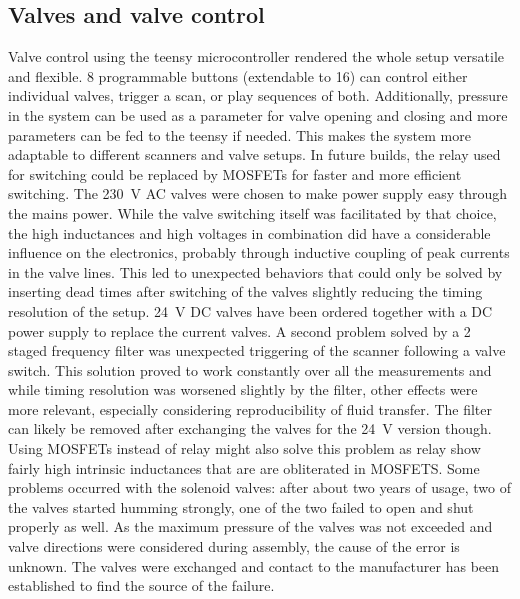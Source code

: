         \subsection{Valves and valve control}
            Valve control using the teensy microcontroller rendered the whole setup versatile and flexible. 8 programmable buttons (extendable to 16) can control either individual valves, trigger a scan, or play sequences of both. Additionally, pressure in the system can be used as a parameter for valve opening and closing and more parameters can be fed to the teensy if needed. This makes the system more adaptable to different scanners and valve setups. In future builds, the relay used for switching could be replaced by MOSFETs for faster and more efficient switching. 
            The \SI{230}{\volt} AC valves were chosen to make power supply easy through the mains power. While the valve switching itself was facilitated by that choice, the high inductances and high voltages in combination did have a considerable influence on the electronics, probably through inductive coupling of peak currents in the valve lines. This led to unexpected behaviors that could only be solved by inserting dead times after switching of the valves slightly reducing the timing resolution of the setup. \SI{24}{\volt} DC valves have been ordered together with a DC power supply to replace the current valves. A second problem solved by a 2 staged frequency filter was unexpected triggering of the scanner following a valve switch. This solution proved to work constantly over all the measurements and while timing resolution was worsened slightly by the filter, other effects were more relevant, especially considering reproducibility of fluid transfer. The filter can likely be removed after exchanging the valves for the \SI{24}{\volt} version though. Using MOSFETs instead of relay might also solve this problem as relay show fairly high intrinsic inductances that are are obliterated in MOSFETS. 
            Some problems occurred with the solenoid valves: after about two years of usage, two of the valves started humming strongly, one of the two failed to open and shut properly as well. As the maximum pressure of the valves was not exceeded and valve directions were considered during assembly, the cause of the error is unknown. The valves were exchanged and contact to the manufacturer has been established to find the source of the failure.
